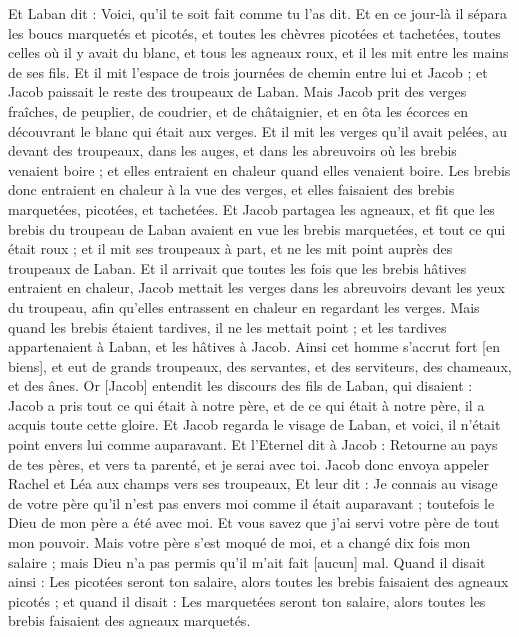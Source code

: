 \begin{multicols}{2}
Et Laban dit : Voici, qu'il te soit fait comme tu l'as dit.
Et en ce jour-là il sépara les boucs marquetés et picotés, et toutes les chèvres picotées et tachetées, toutes celles où il y avait du blanc, et tous les agneaux roux, et il les mit entre les mains de ses fils.
Et il mit l'espace de trois journées de chemin entre lui et Jacob ; et Jacob paissait le reste des troupeaux de Laban.
Mais Jacob prit des verges fraîches, de peuplier, de coudrier, et de châtaignier, et en ôta les écorces en découvrant le blanc qui était aux verges.
Et il mit les verges qu'il avait pelées, au devant des troupeaux, dans les auges, et dans les abreuvoirs où les brebis venaient boire ; et elles entraient en chaleur quand elles venaient boire.
Les brebis donc entraient en chaleur à la vue des verges, et elles faisaient des brebis marquetées, picotées, et tachetées.
Et Jacob partagea les agneaux, et fit que les brebis du troupeau de Laban avaient en vue les brebis marquetées, et tout ce qui était roux ; et il mit ses troupeaux à part, et ne les mit point auprès des troupeaux de Laban.
Et il arrivait que toutes les fois que les brebis hâtives entraient en chaleur, Jacob mettait les verges dans les abreuvoirs devant les yeux du troupeau, afin qu'elles entrassent en chaleur en regardant les verges.
Mais quand les brebis étaient tardives, il ne les mettait point ; et les tardives appartenaient à Laban, et les hâtives à Jacob.
Ainsi cet homme s'accrut fort [en biens], et eut de grands troupeaux, des servantes, et des serviteurs, des chameaux, et des ânes.
\VerseOne{}Or [Jacob] entendit les discours des fils de Laban, qui disaient : Jacob a pris tout ce qui était à notre père, et de ce qui était à notre père, il a acquis toute cette gloire.
Et Jacob regarda le visage de Laban, et voici, il n'était point envers lui comme auparavant.
Et l'Eternel dit à Jacob : Retourne au pays de tes pères, et vers ta parenté, et je serai avec toi.
Jacob donc envoya appeler Rachel et Léa aux champs vers ses troupeaux,
Et leur dit : Je connais au visage de votre père qu'il n'est pas envers moi comme il était auparavant ; toutefois le Dieu de mon père a été avec moi.
Et vous savez que j'ai servi votre père de tout mon pouvoir.
Mais votre père s'est moqué de moi, et a changé dix fois mon salaire ; mais Dieu n'a pas permis qu'il m'ait fait [aucun] mal.
Quand il disait ainsi : Les picotées seront ton salaire, alors toutes les brebis faisaient des agneaux picotés ; et quand il disait : Les marquetées seront ton salaire, alors toutes les brebis faisaient des agneaux marquetés.

\end{multicols}

